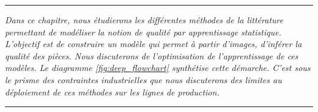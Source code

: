 %
%


\begin{center}
\rule{0.7\linewidth}{.5pt}
\begin{minipage}{0.7\linewidth}
\smallskip

\textit{
	Dans ce chapitre, nous étudierons les différentes méthodes de la littérature permettant de modéliser la notion de qualité par apprentissage statistique.
	L'objectif est de construire un modèle qui permet à partir d'images, d'inférer la qualité des pièces.
	Nous discuterons de l'optimisation de l'apprentissage de ces modèles.
	Le diagramme \ref{fig:deep_flowchart} synthétise cette démarche.
	C'est sous le prisme des contraintes industrielles que nous discuterons des limites au déploiement de ces méthodes sur les lignes de production.
}

\end{minipage}
\smallskip
\rule{0.7\linewidth}{.5pt}
\end{center}

\minitoc

\newpage
\null
\vfill

